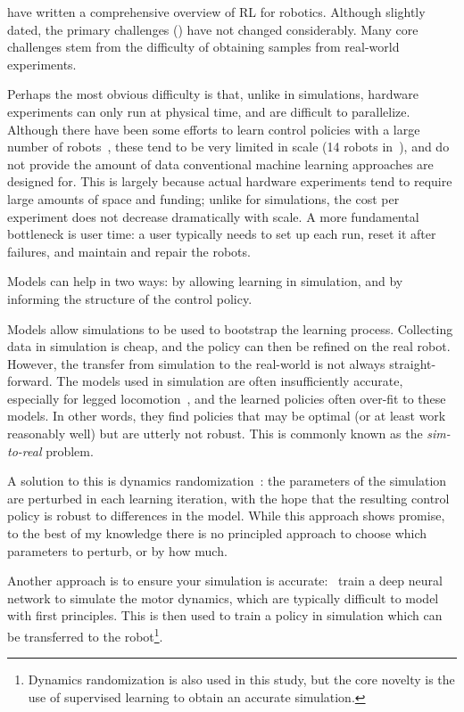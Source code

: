 \textcite{kober2013reinforcement} have written a comprehensive overview of RL for robotics. Although slightly dated, the primary challenges (\cite[see 8.1 in]{kober2013reinforcement}) have not changed considerably. Many core challenges stem from the difficulty of obtaining samples from real-world experiments. \par
Perhaps the most obvious difficulty is that, unlike in simulations, hardware experiments can only run at physical time, and are difficult to parallelize. Although there have been some efforts to learn control policies with a large number of robots~\cite{levine2018learning}, these tend to be very limited in scale (14 robots in~\cite{levine2018learning}), and do not provide the amount of data conventional machine learning approaches are designed for.
This is largely because actual hardware experiments tend to require large amounts of space and funding; unlike for simulations, the cost per experiment does not decrease dramatically with scale.
A more fundamental bottleneck is user time: a user typically needs to set up each run, reset it after failures, and maintain and repair the robots. \par
Models can help in two ways: by allowing learning in simulation, and by informing the structure of the control policy.
 \par
Models allow simulations to be used to bootstrap the learning process. Collecting data in simulation is cheap, and the policy can then be refined on the real robot. However, the transfer from simulation to the real-world is not always straight-forward.
The models used in simulation are often insufficiently accurate, especially for legged locomotion~\cite{neunert2017off,tan2018sim}, and the learned policies often over-fit to these models. In other words, they find policies that may be optimal (or at least work reasonably well) but are utterly not robust. This is commonly known as the \emph{sim-to-real} problem. \par
A solution to this is dynamics randomization~\cite{peng2017sim,lowrey2018reinforcement,tan2018sim}: the parameters of the simulation are perturbed in each learning iteration, with the hope that the resulting control policy is robust to differences in the model. While this approach shows promise, to the best of my knowledge there is no principled approach to choose which parameters to perturb, or by how much. \par
Another approach is to ensure your simulation is accurate:~\textcite{hwangbo2019learning} train a deep neural network to simulate the motor dynamics, which are typically difficult to model with first principles. This is then used to train a policy in simulation which can be transferred to the robot\footnote{Dynamics randomization is also used in this study, but the core novelty is the use of supervised learning to obtain an accurate simulation.}. \par

